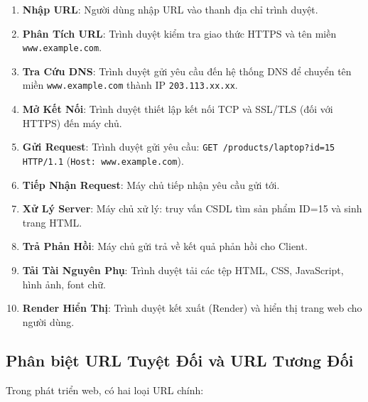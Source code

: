 \documentclass[11pt,oneside]{book}
\newcommand{\codeinline}[1]{\textcolor{accentOrange}{\texttt{#1}}}
\begin{document}
\begin{conceptBox}
\begin{enumerate}[label=\textbf{\color{conceptBorder}Bước \arabic*:}, leftmargin=4.8em, itemsep=3pt, parsep=0pt, topsep=4pt]
    \item \textbf{Nhập URL}: Người dùng nhập URL vào thanh địa chỉ trình duyệt.
    \item \textbf{Phân Tích URL}: Trình duyệt kiểm tra giao thức HTTPS và tên miền \codeinline{www.example.com}.
    \item \textbf{Tra Cứu DNS}: Trình duyệt gửi yêu cầu đến hệ thống DNS để chuyển tên miền \codeinline{www.example.com} thành IP \codeinline{203.113.xx.xx}.
    \item \textbf{Mở Kết Nối}: Trình duyệt thiết lập kết nối TCP và SSL/TLS (đối với HTTPS) đến máy chủ.
    \item \textbf{Gửi Request}: Trình duyệt gửi yêu cầu: \codeinline{GET /products/laptop?id=15 HTTP/1.1} (\codeinline{Host: www.example.com}).
    \item \textbf{Tiếp Nhận Request}: Máy chủ tiếp nhận yêu cầu gửi tới.
    \item \textbf{Xử Lý Server}: Máy chủ xử lý: truy vấn CSDL tìm sản phẩm ID=15 và sinh trang HTML.
    \item \textbf{Trả Phản Hồi}: Máy chủ gửi trả về kết quả phản hồi cho Client.
    \item \textbf{Tải Tài Nguyên Phụ}: Trình duyệt tải các tệp HTML, CSS, JavaScript, hình ảnh, font chữ.
    \item \textbf{Render Hiển Thị}: Trình duyệt kết xuất (Render) và hiển thị trang web cho người dùng.
\end{enumerate}
\end{conceptBox}

\subsection{Phân biệt URL Tuyệt Đối và URL Tương Đối}

Trong phát triển web, có hai loại URL chính:
\end{document}
